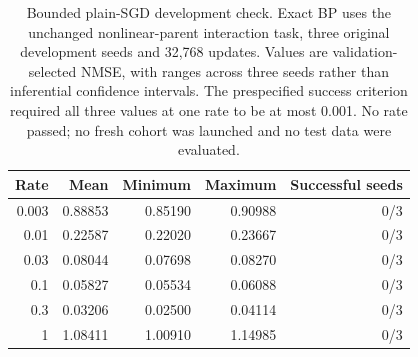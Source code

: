 \begin{table}[p]
\centering
\caption{Bounded plain-SGD development check. Exact BP uses the unchanged nonlinear-parent interaction task, three original development seeds and 32,768 updates. Values are validation-selected NMSE, with ranges across three seeds rather than inferential confidence intervals. The prespecified success criterion required all three values at one rate to be at most 0.001. No rate passed; no fresh cohort was launched and no test data were evaluated.}
\label{tab:sgd_development}
\begin{tabular}{rrrrr}
\toprule
Rate & Mean & Minimum & Maximum & Successful seeds \\
\midrule
0.003 & 0.88853 & 0.85190 & 0.90988 & 0/3 \\
0.01 & 0.22587 & 0.22020 & 0.23667 & 0/3 \\
0.03 & 0.08044 & 0.07698 & 0.08270 & 0/3 \\
0.1 & 0.05827 & 0.05534 & 0.06088 & 0/3 \\
0.3 & 0.03206 & 0.02500 & 0.04114 & 0/3 \\
1 & 1.08411 & 1.00910 & 1.14985 & 0/3 \\
\bottomrule
\end{tabular}
\end{table}

